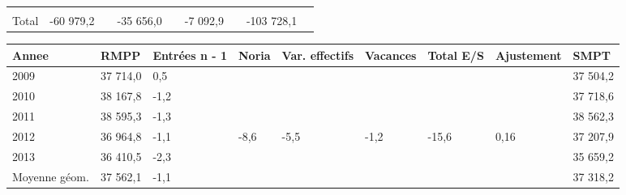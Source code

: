 \begin{longtable}[]{@{}lllllllll@{}}
\begin{minipage}[t]{0.06\columnwidth}
\strut
\end{minipage} & \begin{minipage}[t]{0.12\columnwidth}\raggedright
\strut
\end{minipage} & \begin{minipage}[t]{0.06\columnwidth}\raggedright
\strut
\end{minipage} & \begin{minipage}[t]{0.09\columnwidth}\raggedright
\strut
\end{minipage} & \begin{minipage}[t]{0.06\columnwidth}\raggedright
\strut
\end{minipage}\tabularnewline
\begin{minipage}[t]{0.05\columnwidth}\raggedright
Total\strut
\end{minipage} & \begin{minipage}[t]{0.10\columnwidth}\raggedright
-60 979,2\strut
\end{minipage} & \begin{minipage}[t]{0.06\columnwidth}\raggedright
\strut
\end{minipage} & \begin{minipage}[t]{0.16\columnwidth}\raggedright
-35 656,0\strut
\end{minipage} & \begin{minipage}[t]{0.06\columnwidth}\raggedright
\strut
\end{minipage} & \begin{minipage}[t]{0.12\columnwidth}\raggedright
-7 092,9\strut
\end{minipage} & \begin{minipage}[t]{0.06\columnwidth}\raggedright
\strut
\end{minipage} & \begin{minipage}[t]{0.09\columnwidth}\raggedright
-103 728,1\strut
\end{minipage} & \begin{minipage}[t]{0.06\columnwidth}\raggedright
\strut
\end{minipage}\tabularnewline
\bottomrule
\end{longtable}

\begin{longtable}[]{@{}lllllllll@{}}
\toprule
Annee & RMPP & Entrées n - 1 & Noria & Var. effectifs & Vacances & Total
E/S & Ajustement & SMPT\tabularnewline
\midrule
\endhead
2009 & 37 714,0 & 0,5 & & & & & & 37 504,2\tabularnewline
2010 & 38 167,8 & -1,2 & & & & & & 37 718,6\tabularnewline
2011 & 38 595,3 & -1,3 & & & & & & 38 562,3\tabularnewline
2012 & 36 964,8 & -1,1 & -8,6 & -5,5 & -1,2 & -15,6 & 0,16 & 37
207,9\tabularnewline
2013 & 36 410,5 & -2,3 & & & & & & 35 659,2\tabularnewline
Moyenne géom. & 37 562,1 & -1,1 & & & & & & 37 318,2\tabularnewline
\bottomrule
\end{longtable}

